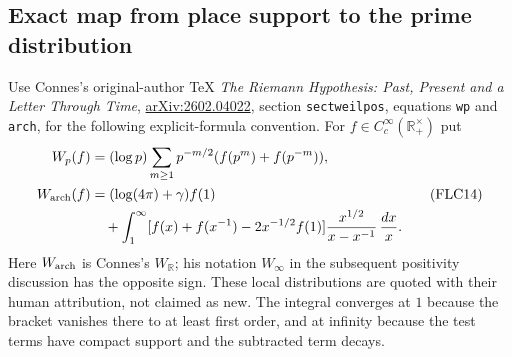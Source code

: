 \documentclass[11pt]{article}
\begin{document}
\subsection{Exact map from place support to the prime distribution}
Use Connes's original-author TeX \emph{The Riemann Hypothesis: Past,
Present and a Letter Through Time},
\href{https://arxiv.org/abs/2602.04022}{arXiv:2602.04022}, section
\texttt{sectweilpos}, equations \texttt{wp} and \texttt{arch}, for
the following explicit-formula convention. For
$f\in C_c^\infty(\mathbb R_+^\times)$ put
\[
\begin{split}
W_p(f)&=(\log p)\sum_{m\ge1}p^{-m/2}
                  (f(p^m)+f(p^{-m})),\\
W_{\rm arch}(f)&=(\log(4\pi)+\gamma)f(1)\\
&\quad+\int_1^\infty
 [f(x)+f(x^{-1})-2x^{-1/2}f(1)]
 \frac{x^{1/2}}{x-x^{-1}}\,\frac{dx}{x}.
\end{split}
\tag{FLC14}
\]
Here $W_{\rm arch}$ is Connes's $W_{\mathbb R}$; his notation
$W_\infty$ in the subsequent positivity discussion has the opposite
sign. These local distributions are quoted with their human attribution,
not claimed as new. The integral converges at $1$ because the bracket
vanishes there to at least first order, and at infinity because the
test terms have compact support and the subtracted term decays.
\end{document}
